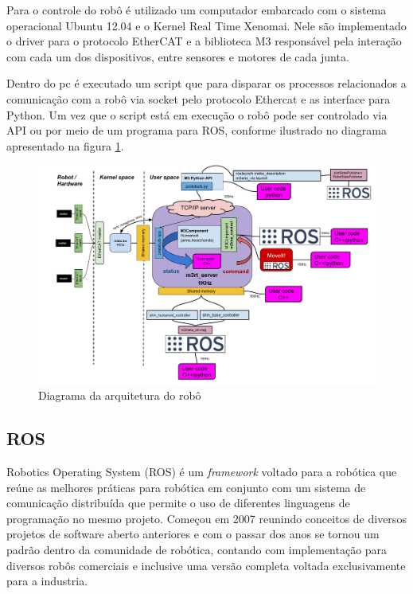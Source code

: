 Para o controle do robô é utilizado um computador embarcado com o sistema operacional Ubuntu 12.04 e o Kernel Real Time Xenomai. Nele são implementado o driver para o protocolo EtherCAT e a biblioteca M3 responsável pela interação com cada um dos dispositivos, entre sensores e motores de cada junta.

Dentro do pc é executado um script que para disparar os processos relacionados a comunicação com a robô via socket pelo protocolo Ethercat e as interface para Python. Um vez que o script está em execução o robô pode ser controlado via API ou por meio de um programa para ROS, conforme ilustrado no diagrama apresentado na figura \ref{fig:m3arch}.


\begin{figure}[ht]
    \centering
    \includegraphics[width=\linewidth]{figs/m3_arch.pdf}
    \caption{Diagrama da arquitetura do robô\cite{nobody}}
    \label{fig:m3arch}
\end{figure}

\subsection{ROS}

Robotics Operating System (ROS) é um \textit{framework} voltado para a robótica que reúne as melhores práticas para robótica em conjunto com um sistema de comunicação distribuída que permite o uso de diferentes linguagens de programação no mesmo projeto. Começou em 2007 reunindo conceitos de diversos projetos de software aberto anteriores e com o passar dos anos se tornou um padrão dentro da comunidade de robótica, contando com implementação para diversos robôs comerciais e inclusive uma versão completa voltada exclusivamente para a industria. \cite{nobody}

